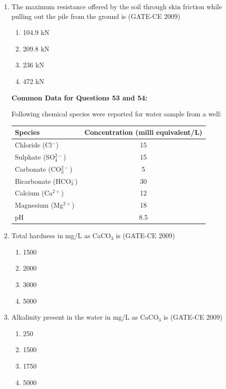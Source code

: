 \documentclass[journal,12pt,onecolumn]{article}
\theoremstyle{remark}
\begin{document}
\begin{enumerate}
    \item The maximum resistance offered by the soil through skin friction while pulling out the pile from the ground is (GATE-CE 2009)
    \begin{enumerate}
        \item 104.9 kN 
        \item 209.8 kN 
        \item 236 kN 
        \item 472 kN
    \end{enumerate}

\textbf{Common Data for Questions 53 and 54:}

Following chemical species were reported for water sample from a well:
\begin{center}
\begin{tabular}{|l|c|}
\hline
\textbf{Species} & \textbf{Concentration (milli equivalent/L)} \\
\hline
Chloride (Cl$^-$) & 15 \\
Sulphate (SO$_4^{2-}$) & 15 \\
Carbonate (CO$_3^{2-}$) & 5 \\
Bicarbonate (HCO$_3^-$) & 30 \\
Calcium (Ca$^{2+}$) & 12 \\
Magnesium (Mg$^{2+}$) & 18 \\
pH & 8.5 \\
\hline
\end{tabular}
\end{center}

    \item Total hardness in mg/L as CaCO$_3$ is (GATE-CE 2009)
    \begin{enumerate}
        \item 1500 
        \item 2000 
        \item 3000 
        \item 5000
    \end{enumerate}
    
    \item Alkalinity present in the water in mg/L as CaCO$_3$ is (GATE-CE 2009)
    \begin{enumerate}
        \item 250 
        \item 1500 
        \item 1750 
        \item 5000
    \end{enumerate}


\end{enumerate}
\end{document}
